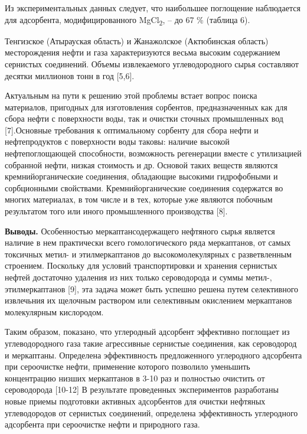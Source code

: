 \begin{multicols}{2}
Из экспериментальных данных следует, что наибольшее поглощение
наблюдается для адсорбента, модифицированного MgCl\textsubscript{2}, --
до 67 \% (таблица 6).

Тенгизское (Атырауская область) и Жанажолское (Актюбинская область)
месторождения нефти и газа характеризуются весьма высоким содержанием
сернистых соединений. Объемы извлекаемого углеводородного сырья
составляют десятки миллионов тонн в год {[}5,6{]}.

Актуальным на пути к решению этой проблемы встает вопрос поиска
материалов, пригодных для изготовления сорбентов, предназначенных как
для сбора нефти с поверхности воды, так и очистки сточных промышленных
вод {[}7{]}.Основные требования к оптимальному сорбенту для сбора нефти
и нефтепродуктов с поверхности воды таковы: наличие высокой
нефтепоглощающей способности, возможность регенерации вместе с
утилизацией собранной нефти, низкая стоимость и др. Основой таких
веществ являются кремнийорганические соединения, обладающие высокими
гидрофобными и сорбционными свойствами. Кремнийорганические соединения
содержатся во многих материалах, в том числе и в тех, которые уже
являются побочным результатом того или иного промышленного производства
{[}8{]}.

{\bfseries Выводы.} Особенностью меркаптансодержащего нефтяного сырья
является наличие в нем практически всего гомологического ряда
меркаптанов, от самых токсичных метил- и этилмеркаптанов до
высокомолекулярных с разветвленным строением. Поскольку для условий
транспортировки и хранения сернистых нефтей достаточно удаления из них
только сероводорода и суммы метил-, этилмеркаптанов {[}9{]}, эта задача
может быть успешно решена путем селективного извлечьния их щелочным
раствором или селективным окислением меркаптанов молекулярным
кислородом.

Таким образом, показано, что углеродный адсорбент эффективно поглощает
из углеводородного газа такие агрессивные сернистые соединения, как
сероводород и меркаптаны. Определена эффективность предложенного
углеродного адсорбента при сероочистке нефти, применение которого
позволило уменьшить концентрацию низших меркаптанов в 3-10 раз и
полностью очистить от сероводорода {[}10-12{]} В результате проведенных
экспериментов разработаны новые приемы подготовки активных адсорбентов
для очистки нефтяных углеводородов от сернистых соединений, определена
эффективность углеродного адсорбента при сероочистке нефти и природного
газа.
\end{multicols}

